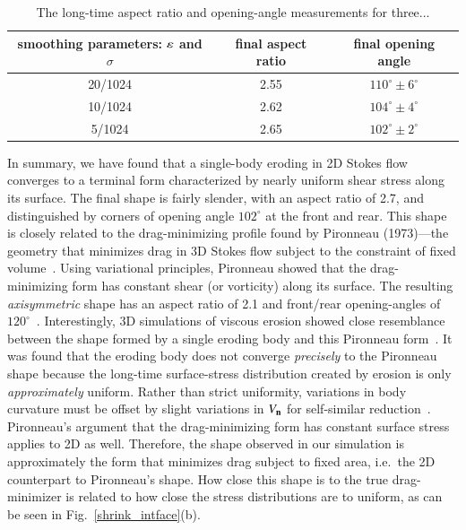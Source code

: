 \documentclass[preprint, 10pt]{elsarticle}
\begin{document}
\begin{table}%
\begin{center}
\caption{The long-time aspect ratio and opening-angle measurements for three...
} 
\vspace{0.3 pc}
\label{table:arangle}
\begin{tabular}{c c c}
\hline
\hspace{0.5pc} smoothing parameters: $\varepsilon$ and $\sigma$
\hspace{0.5pc} & final aspect ratio 
\hspace{0.5pc} & final opening angle \\
\hline
20/1024		& 2.55	& $110^\circ \pm 6^\circ$	\\
10/1024		& 2.62	& $104^\circ \pm 4^\circ$	\\
5/1024		& 2.65	& $102^\circ \pm 2^\circ$	\\
\hline
\end{tabular}
\end{center}
\end{table}

	In summary, we have found that a single-body eroding in 2D
        Stokes flow converges to a terminal form characterized by nearly
        uniform shear stress along its surface. The final shape is
        fairly slender, with an aspect ratio of 2.7, and distinguished
        by  corners of opening angle $102^{\circ}$ at the front and
        rear. This shape is closely related to the drag-minimizing
        profile found by Pironneau (1973)---the geometry that
        minimizes drag in 3D Stokes flow subject to the constraint of
        fixed volume~\cite{pir1973}. Using variational principles,
        Pironneau showed that the drag-minimizing form has constant
        shear (or vorticity) along its surface. The resulting {\em
        axisymmetric} shape has an aspect ratio of 2.1 and front/rear
        opening-angles of $120^{\circ}$~\cite{pir1973, mit-spa2016}.
        Interestingly, 3D simulations of viscous erosion showed close
        resemblance between the shape formed by a single eroding body
        and this Pironneau form~\cite{mit-spa2016}. It was found that
        the eroding body does not converge {\em precisely} to the
        Pironneau shape because the long-time surface-stress
        distribution created by erosion is only {\em approximately}
        uniform. Rather than strict uniformity, variations in body
        curvature must be offset by slight variations in $V_{\mathbf{n}}$ for
        self-similar reduction~\cite{pir1973, mit-spa2016}. Pironneau's
        argument that the drag-minimizing form has constant surface
        stress applies to 2D as well. Therefore, the shape observed in
        our simulation is approximately the form that minimizes drag
        subject to fixed area, i.e.~the 2D counterpart to Pironneau's
        shape. How close this shape is to the true drag-minimizer is
        related to how close the stress distributions are to uniform, as
        can be seen in Fig.~\ref{shrink_intface}(b).
\end{document}
